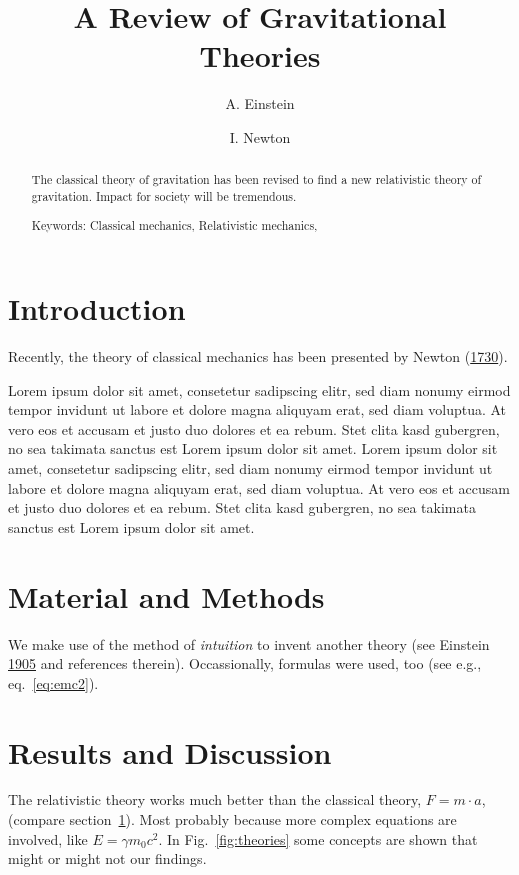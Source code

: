 \documentclass[A4paper,]{article}
\title{A Review of Gravitational Theories}
\author[1,C]{A. Einstein}
\author[2]{I. Newton}
\affil[1]{Federal Office for Intellectual Property, Bern, Switzerland}
\affil[2]{University of Cambridge}
\affil[C]{Correspondence: albert.einstein@gmail.com}
\date{}
\begin{document}
\maketitle
\begin{abstract}
The classical theory of gravitation has been revised to find a new relativistic theory of gravitation. Impact for society will be tremendous.

    \vspace*{1em}
    Keywords:  Classical mechanics,  Relativistic mechanics, 
\end{abstract}

\section{Introduction}\label{sec:intro}

Recently, the theory of classical mechanics has been presented by Newton (\protect\hyperlink{ref-Newton1730}{1730}).

Lorem ipsum dolor sit amet, consetetur sadipscing elitr, sed diam nonumy eirmod tempor invidunt ut labore et dolore magna aliquyam erat, sed diam voluptua. At vero eos et accusam et justo duo dolores et ea rebum. Stet clita kasd gubergren, no sea takimata sanctus est Lorem ipsum dolor sit amet. Lorem ipsum dolor sit amet, consetetur sadipscing elitr, sed diam nonumy eirmod tempor invidunt ut labore et dolore magna aliquyam erat, sed diam voluptua. At vero eos et accusam et justo duo dolores et ea rebum. Stet clita kasd gubergren, no sea takimata sanctus est Lorem ipsum dolor sit amet.

\section{Material and Methods}\label{material-and-methods}

We make use of the method of \emph{intuition} to invent another theory (see Einstein \protect\hyperlink{ref-Einstein1905}{1905} and references therein). Occassionally, formulas were used, too (see e.g., eq.~\ref{eq:emc2}).

\section{Results and Discussion}\label{results-and-discussion}

The relativistic theory works much better than the classical theory, \(F=m\cdot a​\), (compare section~\ref{sec:intro}). Most probably because more complex equations are involved, like \(E=\gamma m_0c^2​\).
In Fig.~\ref{fig:theories} some concepts are shown that might or might not our findings.
\end{document}
